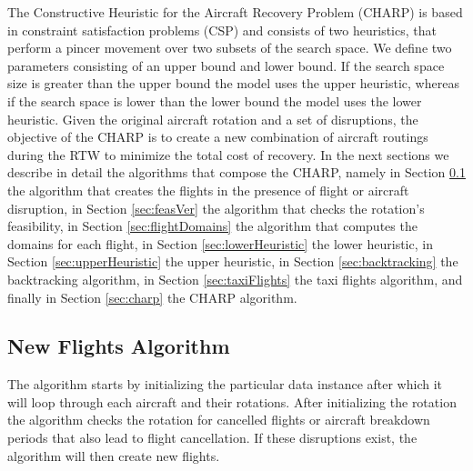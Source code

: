 

\newcommand\mycommfont[1]{\footnotesize\ttfamily\textcolor{blue}{#1}}



%
	
	The Constructive Heuristic for the Aircraft Recovery Problem (CHARP) is based in constraint satisfaction problems (CSP) and consists of two heuristics, that perform a pincer movement over two subsets of the search space. We define two parameters consisting of an upper bound and lower bound. If the search space size is greater than the upper bound the model uses the upper heuristic, whereas if the search space is lower than the lower bound the model uses the lower heuristic.
	 Given the original aircraft rotation and a set of disruptions, the objective of the CHARP is to create a new combination of aircraft routings during the RTW to minimize the total cost of recovery. 
	In the next sections we describe in detail the algorithms that compose the CHARP, namely in Section \ref{sec:newFlightsAlgo} the algorithm that creates the flights in the presence of flight or aircraft disruption, in Section \ref{sec:feasVer}  the algorithm that checks the rotation's feasibility, in Section \ref{sec:flightDomains} the algorithm that computes the domains for each flight, in Section \ref{sec:lowerHeuristic} the lower heuristic, in Section \ref{sec:upperHeuristic} the upper heuristic, in Section \ref{sec:backtracking}  the backtracking algorithm, in Section \ref{sec:taxiFlights} the taxi flights algorithm, and finally in Section \ref{sec:charp} the CHARP algorithm.


	\subsection{New Flights Algorithm} \label{sec:newFlightsAlgo}
	The algorithm starts by initializing the particular data instance after which it will loop through each aircraft and their rotations. After initializing the rotation the algorithm checks the rotation for cancelled flights or aircraft breakdown periods that also lead to flight cancellation. If these disruptions exist, the algorithm will then create new flights.
	
